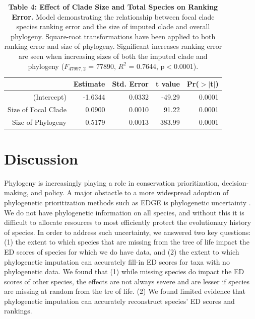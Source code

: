 \documentclass[12pt,english]{article}
\begin{document}
\begin{table}[ht]
  \centering
  \begin{tabular}{rrrrr}
    \hline
   & Estimate & Std. Error & t value & Pr($>$$|$t$|$) \\
    \hline
  (Intercept) & -1.6344 & 0.0332 & -49.29 & 0.0001 \\
    Size of Focal Clade & 0.0900 & 0.0010 & 91.22 & 0.0001 \\
    Size of Phylogeny & 0.5179 & 0.0013 & 383.99 & 0.0001 \\
     \hline
     \hline
  \end{tabular}
  \caption*{\textbf{Table 4: Effect of Clade Size and Total Species on Ranking
  Error.} Model demonstrating the relationship between focal clade species
  ranking error and the size of imputed clade and overall phylogeny. Square-root
  transformations have been applied to both ranking error and size of phylogeny.
  Significant increases ranking error are seen when increasing sizes of both the
  imputed clade and phylogeny ($F_{47997, 2}$ = 77890, $R^{2}$ = 0.7644,
  p$<$0.0001).}
  \end{table}

\clearpage
\section*{Discussion}
Phylogeny is increasingly playing a role in conservation prioritization,
decision-making, and policy. A major obstactle to a more widespread adoption of
phylogenetic prioritization methods such as EDGE is phylogenetic uncertainty
\autocite{Collen2015}. We do not have phylogenetic information on all species,
and without this it is difficult to allocate resources to most efficiently
protect the evolutionary history of species. In order to address such
uncertainty, we answered two key questions: (1) the extent to which species that
are missing from the tree of life impact the ED scores of species for which we
do have data, and (2) the extent to which phylogenetic imputation can accurately
fill-in ED scores for taxa with no phylogenetic data. We found that (1) while
missing species do impact the ED scores of other species, the effects are not
always severe and are lesser if species are missing at random from the tre of
life. (2) We found limited evidence that phylogenetic imputation can accurately
reconstruct species' ED scores and rankings.
\end{document}
